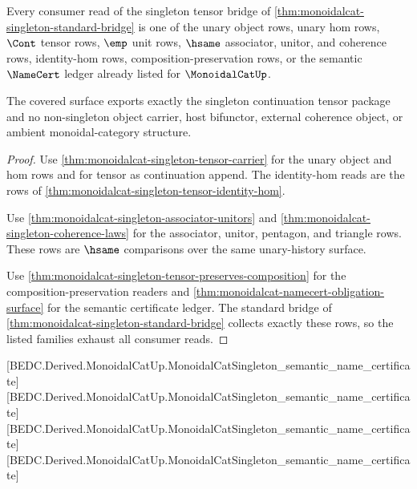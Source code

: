 \begin{theorem}
\label{thm:monoidalcat-singleton-tensor-consumer-coverage}
Every consumer read of the singleton tensor bridge of
\autoref{thm:monoidalcat-singleton-standard-bridge} is one of the unary object
rows, unary hom rows, $\Cont$ tensor rows, $\emp$ unit rows, $\hsame$
associator, unitor, and coherence rows, identity-hom rows,
composition-preservation rows, or the semantic $\NameCert$ ledger already
listed for $\MonoidalCatUp$.

The covered surface exports exactly the singleton continuation tensor package
and no non-singleton object carrier, host bifunctor, external coherence object,
or ambient monoidal-category structure.
\end{theorem}
\begin{proof}
Use \autoref{thm:monoidalcat-singleton-tensor-carrier} for the unary object and
hom rows and for tensor as continuation append. The identity-hom reads are the
rows of \autoref{thm:monoidalcat-singleton-tensor-identity-hom}.

Use \autoref{thm:monoidalcat-singleton-associator-unitors} and
\autoref{thm:monoidalcat-singleton-coherence-laws} for the associator, unitor,
pentagon, and triangle rows. These rows are $\hsame$ comparisons over the same
unary-history surface.

Use \autoref{thm:monoidalcat-singleton-tensor-preserves-composition} for the
composition-preservation readers and
\autoref{thm:monoidalcat-namecert-obligation-surface} for the semantic
certificate ledger. The standard bridge of
\autoref{thm:monoidalcat-singleton-standard-bridge} collects exactly these
rows, so the listed families exhaust all consumer reads.
\end{proof}

[BEDC.Derived.MonoidalCatUp.MonoidalCatSingleton\_semantic\_name\_certificate]
[BEDC.Derived.MonoidalCatUp.MonoidalCatSingleton\_semantic\_name\_certificate]
[BEDC.Derived.MonoidalCatUp.MonoidalCatSingleton\_semantic\_name\_certificate]
[BEDC.Derived.MonoidalCatUp.MonoidalCatSingleton\_semantic\_name\_certificate]

